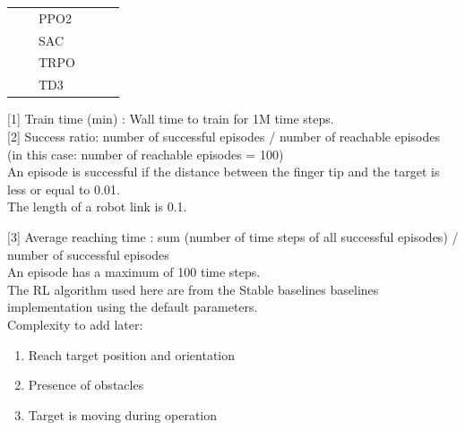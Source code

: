 \documentclass{article}
\begin{document}
\begin{longtable}{llllll}
                                                                                &                                                                          & PPO2         &                          &                       &                            \\
                                                                                &                                                                          & SAC          &                          &                       &                            \\
                                                                                &                                                                          & TRPO         &                          &                       &                            \\
                                                                                &                                                                          & TD3          &                          &                       &                         \\  
\hline
\end{longtable}


[1] Train time (min) : Wall time to train for 1M time steps. \\ 

[2] Success ratio: number of successful episodes / number of reachable episodes (in this case: number of reachable episodes = 100) \\ 
An episode is successful if the distance between the finger tip and the target is less or equal to 0.01. \\ 
The length of a robot link is 0.1.

[3] Average reaching time : sum (number of time steps of all successful episodes) /  number of successful episodes \\ 
An episode has a maximum of 100 time steps. \\ 

The RL algorithm used here are from the Stable baselines baselines implementation using the default parameters. \\ 



Complexity to add later:
\begin{enumerate}
  \item Reach target position and orientation
  \item Presence of obstacles
  \item Target is moving during operation
\end{enumerate}
\end{document}
